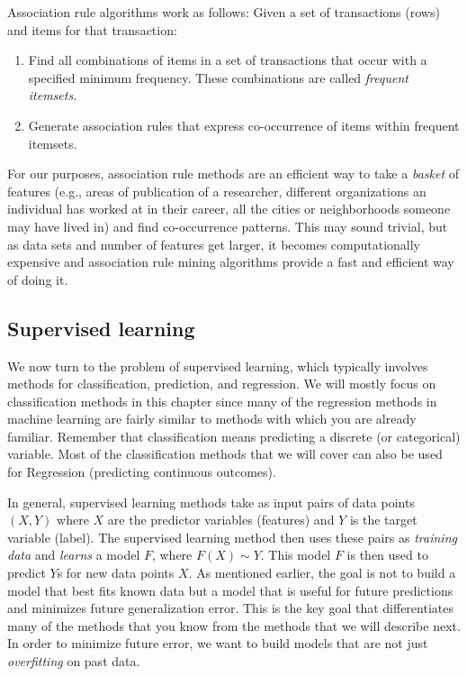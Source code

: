 \documentclass[]{krantz}
\begin{document}
Association rule algorithms work as follows: Given a set of transactions
(rows) and items for that transaction:

\begin{enumerate}
\def\labelenumi{\arabic{enumi}.}
\item
  Find all combinations of items in a set of transactions that occur
  with a specified minimum frequency. These combinations are called
  \emph{frequent itemsets}.
\item
  Generate association rules that express co-occurrence of items within
  frequent itemsets.
\end{enumerate}

For our purposes, association rule methods are an efficient way to take
a \emph{basket} of features (e.g., areas of publication of a researcher,
different organizations an individual has worked at in their career, all
the cities or neighborhoods someone may have lived in) and find
co-occurrence patterns. This may sound trivial, but as data sets and
number of features get larger, it becomes computationally expensive and
association rule mining algorithms provide a fast and efficient way of
doing it.

\subsection{Supervised learning}\label{sec:MLchapter:super}

We now turn to the problem of supervised learning, which typically
involves methods for classification, prediction, and regression. We will
mostly focus on classification methods in this chapter since many of the
regression methods in machine learning are fairly similar to methods
with which you are already familiar. Remember that classification means
predicting a discrete (or categorical) variable. Most of the
classification methods that we will cover can also be used for
Regression (predicting continuous outcomes).

In general, supervised learning methods take as input pairs of data
points \((X,Y)\) where \(X\) are the predictor variables (features) and
\(Y\) is the target variable (label). The supervised learning method
then uses these pairs as \emph{training data} and \emph{learns} a model
\(F\), where \(F(X)\sim Y\). This model \(F\) is then used to predict
\(Y\)s for new data points \(X\). As mentioned earlier, the goal is not
to build a model that best fits known data but a model that is useful
for future predictions and minimizes future generalization error. This
is the key goal that differentiates many of the methods that you know
from the methods that we will describe next. In order to minimize future
error, we want to build models that are not just \emph{overfitting} on
past data.
\end{document}
